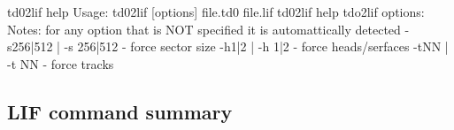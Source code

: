 \begin{DoxyPre}    td02lif help
    Usage: td02lif [options] file.td0 file.lif
           td02lif help
    tdo2lif options:
    Notes: for any option that is NOT specified it is automattically detected
             -s256|512 | -s 256|512 - force sector size
             -h1|2 | -h 1|2 - force heads/serfaces
             -tNN | -t NN  - force tracks\end{DoxyPre}



\begin{DoxyPre}\end{DoxyPre}


\subsection*{L\+IF command summary}



